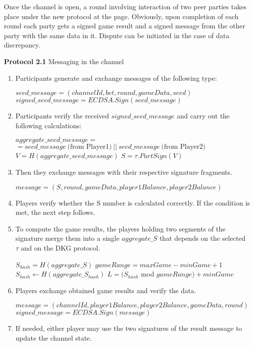 Once the channel is open, a round involving interaction of two peer parties takes place under the new protocol at the  \pageref{intchannel1} page. Obviously, upon completion of each round each party gets a signed game result and a signed message from the other party with the same data in it. Dispute can be initiated in the case of data discrepancy.
\begin{algorithm} 
\caption*{\textbf{Protocol 2.1} Messaging in the channel}
\begin{enumerate}
	\item Participants generate and exchange messages of the following type:
 \label{intchannel1}
\begin{center}
$ seed\_message = (channelId, bet, round, gameData, seed)$
$signed\_seed\_message = ECDSA.Sign(seed\_message)$ 
\end{center}
	\item Participants verify the received $signed\_seed\_message$ and carry out the following calculations:
 \begin{algorithmic}
\State $aggregate\_seed\_message =$ \\ $= seed\_message \  \text{(from Player1)} \ ||  \ seed\_message \  \text{(from Player2)}$
\State $V = H(aggregate\_seed\_message)$
\State $S =  \tau .PartSign(V)$
 \end{algorithmic}
\item Then they exchange messages with their respective signature fragments.
\begin{center}
 $message = (S, round, gameData, player1Balance, player2Balance)$
\end{center}
	\item Players verify whether the S number is calculated correctly. If the condition is met, the next step follows.
	\item To compute the game results, the players holding two segments of the signature merge them into a single $aggregate\_S$ that depends on the selected  $\tau$ and on the DKG protocol.
\begin{algorithmic}
\State $S_{hash} = H(aggregate\_S)$
\State $gameRange = maxGame -  minGame + 1$
\State$ S_{hash}\gets H(aggregate\_S_{hash})$
\EndWhile
\State $L = (S_{hash}$ mod $gameRange) + minGame$
\end{algorithmic}
\end{enumerate}
\end{algorithm}
\begin{algorithm}
\begin{enumerate}
\setcounter{enumi}{5}
 \item Players exchange obtained game results and verify the data. 
\begin{center}
 $message = (channelId, player1Balance, player2Balance, gameData, round)$
 $signed\_message = ECDSA.Sign(message)$
\end{center}
\item If needed, either player may use the two signatures of the result message to update the channel state.
\end{enumerate}
\end{algorithm}

